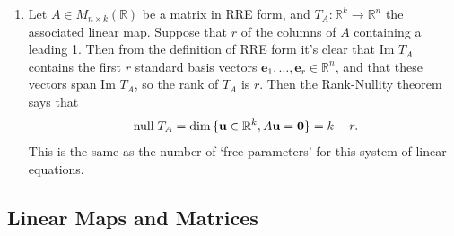 \documentclass[12pt]{report}
\theoremstyle{definition}
\begin{document}
\begin{ex}
\begin{enumerate}[label = (\alph*)]
        \item Let $A \in M_{n\times k}(\mathbb{R})$ be a matrix in RRE form, and
            $T_A:\mathbb{R}^{k} \rightarrow{} \mathbb{R}^{n}$ the associated linear map.
            Suppose that $r$ of the columns of $A$ containing a leading 1.
            Then from the definition of RRE form it's clear that Im $T_A$ contains
            the first $r$ standard basis vectors $\mathbf{e}_1, \ldots, \mathbf{e}_r \in \mathbb{R}^{n}$,
            and that these vectors span Im $T_A$, so the rank of $T_A$ is $r$.
            Then the Rank-Nullity theorem says that\[
                \;\textnormal{null}\;T_A = \dim{\{\mathbf{u}\in \mathbb{R}^{k}, A\mathbf{u} = \mathbf{0}\}} = k - r.
            \]This is the same as the number of `free parameters' for this system of linear equations.
    \end{enumerate}
    
\end{ex}


\subsection{Linear Maps and Matrices}%
\label{sec:change-of-basis}
\end{document}
